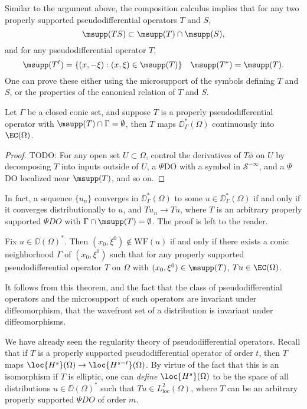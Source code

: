 Similar to the argument above, the composition calculus implies that for any two properly supported pseudodifferential operators $T$ and $S$,
%
\[ \msupp(TS) \subset \msupp(T) \cap \msupp(S), \]
%
and for any pseudodifferential operator $T$,
%
\[ \msupp(T^t) = \{ (x,-\xi): (x,\xi) \in \msupp(T) \} \quad \msupp(T^*) = \msupp(T). \]
%
One can prove these either using the microsupport of the symbols defining $T$ and $S$, or the properties of the canonical relation of $T$ and $S$.

\begin{theorem}
    Let $\Gamma$ be a closed conic set, and suppose $T$ is a properly pseudodifferential operator with $\msupp(T) \cap \Gamma = \emptyset$, then $T$ maps $\DD^*_\Gamma(\Omega)$ continuously into $\EC(\Omega)$.
\end{theorem}
\begin{proof}
    TODO: For any open set $U \subset \Omega$, control the derivatives of $T \phi$ on $U$ by decomposing $T$ into inputs outside of $U$, a $\Psi$DO with a symbol in $\mathcal{S}^{-\infty}$, and a $\Psi$DO localized near $\msupp(T)$, and so on.
\end{proof}

In fact, a sequence $\{ u_n \}$ converges in $\DD^*_\Gamma(\Omega)$ to some $u \in \DD^*_\Gamma(\Omega)$ if and only if it converges distributionally to $u$, and $Tu_n \to Tu$, where $T$ is an arbitrary properly supported $\Psi DO$ with $\Gamma \cap \msupp(T) = \emptyset$. The proof is left to the reader.

\begin{theorem}
    Fix $u \in \DD(\Omega)^*$. Then $(x_0,\xi^0) \not \in \text{WF}(u)$ if and only if there exists a conic neighborhood $\Gamma$ of $(x_0,\xi^0)$ such that for any properly supported pseudodifferential operator $T$ on $\Omega$ with $(x_0,\xi^0) \in \msupp(T)$, $Tu \in \EC(\Omega)$.
\end{theorem}

\begin{remark}
    It follows from this theorem, and the fact that the class of pseudodifferential operators and the microsupport of such operators are invariant under diffeomorphism, that the wavefront set of a distribution is invariant under diffeomorphisms.
\end{remark}

We have already seen the regularity theory of pseudodifferential operators. Recall that if $T$ is a properly supported pseudodifferential operator of order $t$, then $T$ maps $\loc{H^s}(\Omega) \to \loc{H^{s-t}}(\Omega)$. By virtue of the fact that this is an isomorphism if $T$ is elliptic, one can \emph{define} $\loc{H^s}(\Omega)$ to be the space of all distributions $u \in \DD(\Omega)^*$ such that $Tu \in L^2_{\text{loc}}(\Omega)$, where $T$ can be an arbitrary properly supported $\Psi DO$ of order $m$.



